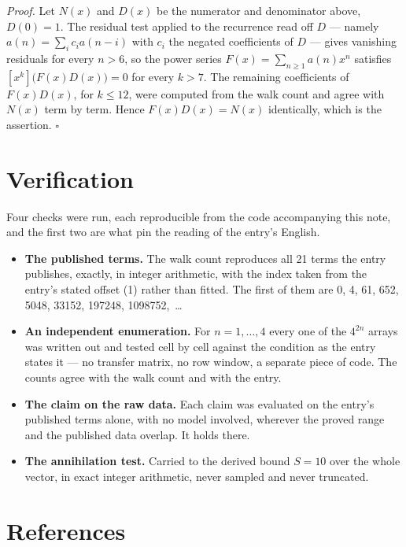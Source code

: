 \documentclass[11pt]{article}
\theoremstyle{definition}
\begin{document}
{\itshape Proof.} Let $N(x)$ and $D(x)$ be the numerator and denominator above, $D(0)=1$. The residual test applied to the recurrence read off $D$ --- namely $a(n) = \sum_i c_i a(n-i)$ with $c_i$ the negated coefficients of $D$ --- gives vanishing residuals for every $n > 6$, so the power series $F(x)=\sum_{n\ge 1}a(n)x^n$ satisfies $[x^k]\bigl(F(x)D(x)\bigr) = 0$ for every $k > 7$. The remaining coefficients of $F(x)D(x)$, for $k \le 12$, were computed from the walk count and agree with $N(x)$ term by term. Hence $F(x)D(x) = N(x)$ identically, which is the assertion. $\square$

\section{Verification}

Four checks were run, each reproducible from the code accompanying this note, and the first two are what pin the reading of the entry's English.

\begin{itemize}

\item {\bfseries The published terms.} The walk count reproduces all 21 terms the entry publishes, exactly, in integer arithmetic, with the index taken from the entry's stated offset (1) rather than fitted. The first of them are 0, 4, 61, 652, 5048, 33152, 197248, 1098752,~\dots

\item {\bfseries An independent enumeration.} For $n = 1,\dots,4$ every one of the $4^{2n}$ arrays was written out and tested cell by cell against the condition as the entry states it --- no transfer matrix, no row window, a separate piece of code. The counts agree with the walk count and with the entry.

\item {\bfseries The claim on the raw data.} Each claim was evaluated on the entry's published terms alone, with no model involved, wherever the proved range and the published data overlap. It holds there.

\item {\bfseries The annihilation test.} Carried to the derived bound $S = 10$ over the whole vector, in exact integer arithmetic, never sampled and never truncated.

\end{itemize}

\section{References}
\end{document}
